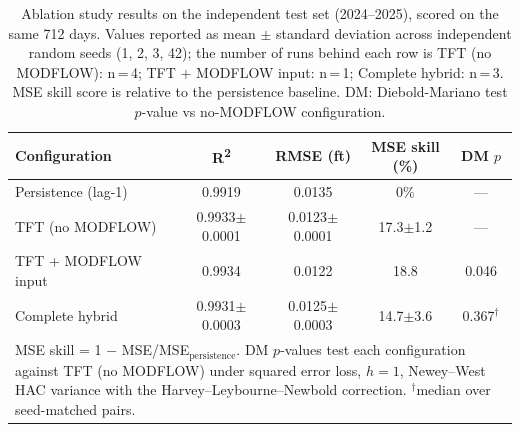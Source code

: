 \begin{table}[t]
\centering
\caption{Ablation study results on the independent test set (2024--2025), scored on the same 712 days. Values reported as mean $\pm$ standard deviation across independent random seeds (1, 2, 3, 42); the number of runs behind each row is TFT (no MODFLOW): n\,=\,4; TFT + MODFLOW input: n\,=\,1; Complete hybrid: n\,=\,3. MSE skill score is relative to the persistence baseline. DM: Diebold-Mariano test $p$-value vs no-MODFLOW configuration.}
\label{tab:ablation}
\renewcommand{\arraystretch}{1.3}
\begin{tabular*}{\textwidth}{
@{\extracolsep\fill}lcccc
@{\extracolsep\fill}}
\toprule
\textbf{Configuration} & 
\textbf{R\textsuperscript{2}} & 
\textbf{RMSE (ft)} & 
\textbf{MSE skill (\%)} &
\textbf{DM $p$} \\
\midrule
Persistence (lag-1) & 0.9919 & 0.0135 & 0\% & --- \\[4pt]
TFT (no MODFLOW) & 0.9933$\pm$0.0001 & 0.0123$\pm$0.0001 & 17.3$\pm$1.2 & --- \\[4pt]
TFT + MODFLOW input & 0.9934 & 0.0122 & 18.8 & 0.046 \\[4pt]
Complete hybrid & 0.9931$\pm$0.0003 & 0.0125$\pm$0.0003 & 14.7$\pm$3.6 & 0.367$^{\dagger}$ \\
\bottomrule
\multicolumn{5}{l}{\footnotesize MSE skill = 1 $-$ MSE/MSE$_{\text{persistence}}$. DM $p$-values test each configuration against TFT (no MODFLOW) under squared error loss, $h=1$, Newey--West HAC variance with the Harvey--Leybourne--Newbold correction. $^{\dagger}$median over seed-matched pairs.}
\end{tabular*}
\end{table}
